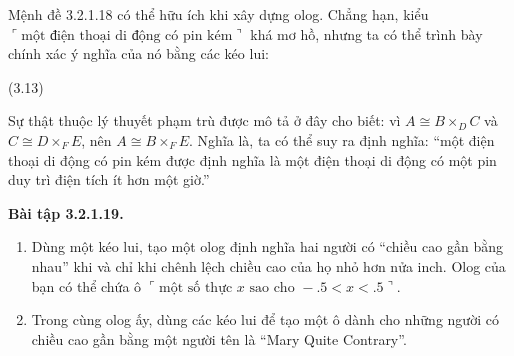 Mệnh đề 3.2.1.18 có thể hữu ích khi xây dựng olog. Chẳng hạn, kiểu $\ulcorner\text{một điện }\allowbreak\text{thoại di }\allowbreak\text{động có }\allowbreak\text{pin kém}\urcorner$ khá mơ hồ, nhưng ta có thể trình bày chính xác ý nghĩa của nó bằng các kéo lui:
\begin{center}\hfill(3.13)\end{center}
Sự thật thuộc lý thuyết phạm trù được mô tả ở đây cho biết: vì $A\cong B\times_DC$ và $C\cong D\times_FE$, nên $A\cong B\times_FE$. Nghĩa là, ta có thể suy ra định nghĩa: ``một điện thoại di động có pin kém được định nghĩa là một điện thoại di động có một pin duy trì điện tích ít hơn một giờ.''

\noindent\textbf{Bài tập 3.2.1.19.}\keepwithnext
\begin{enumerate}[label=\alph*.]
\item Dùng một kéo lui, tạo một olog định nghĩa hai người có ``chiều cao gần bằng nhau'' khi và chỉ khi chênh lệch chiều cao của họ nhỏ hơn nửa inch. Olog của bạn có thể chứa ô $\ulcorner\text{một số thực }x\text{ sao cho }-.5<x<.5\urcorner$.
\item Trong cùng olog ấy, dùng các kéo lui để tạo một ô dành cho những người có chiều cao gần bằng một người tên là ``Mary Quite Contrary''.
\end{enumerate}

